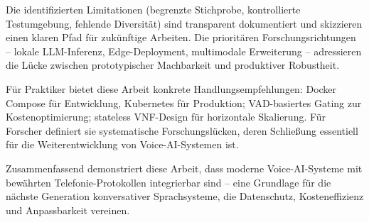 Die identifizierten Limitationen (begrenzte Stichprobe, kontrollierte Testumgebung, fehlende Diversität) sind transparent dokumentiert und skizzieren einen klaren Pfad für zukünftige Arbeiten. Die prioritären Forschungsrichtungen -- lokale \acrshort{LLM}-Inferenz, Edge-Deployment, multimodale Erweiterung -- adressieren die Lücke zwischen prototypischer Machbarkeit und produktiver Robustheit.

Für Praktiker bietet diese Arbeit konkrete Handlungsempfehlungen: Docker Compose für Entwicklung, Kubernetes für Produktion; \acrshort{VAD}-basiertes Gating zur Kostenoptimierung; stateless \acrshort{VNF}-Design für horizontale Skalierung. Für Forscher definiert sie systematische Forschungslücken, deren Schließung essentiell für die Weiterentwicklung von Voice-\acrshort{AI}-Systemen ist.

Zusammenfassend demonstriert diese Arbeit, dass moderne Voice-\acrshort{AI}-Systeme mit bewährten Telefonie-Protokollen integrierbar sind -- eine Grundlage für die nächste Generation konversativer Sprachsysteme, die Datenschutz, Kosteneffizienz und Anpassbarkeit vereinen.
